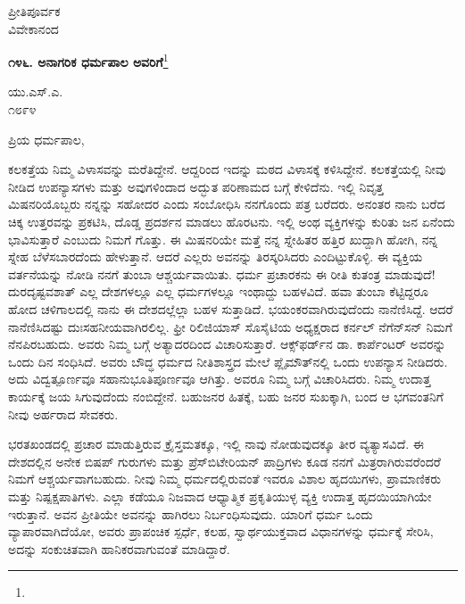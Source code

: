 {\flushright
ಪ್ರೀತಿಪೂರ್ವಕ\\ವಿವೇಕಾನಂದ\par}
\vspace{-0.5cm}

\begin{center}
\textbf{೧೪೬. ಅನಾಗರಿಕ ಧರ್ಮಪಾಲ ಅವರಿಗೆ}\footnote{}
\end{center}

\vspace{-0.6cm}

\begin{flushright}
ಯು.ಎಸ್.ಎ.\\೧೮೯೪
\end{flushright}

\vspace{-0.6cm}

\noindent
ಪ್ರಿಯ ಧರ್ಮಪಾಲ,

ಕಲಕತ್ತೆಯ ನಿಮ್ಮ ವಿಳಾಸವನ್ನು ಮರೆತಿದ್ದೇನೆ. ಆದ್ದರಿಂದ ಇದನ್ನು ಮಠದ ವಿಳಾಸಕ್ಕೆ ಕಳಿಸಿದ್ದೇನೆ. ಕಲಕತ್ತೆಯಲ್ಲಿ ನೀವು ನೀಡಿದ ಉಪನ್ಯಾಸಗಳು ಮತ್ತು ಅವುಗಳಿಂದಾದ ಅದ್ಭುತ ಪರಿಣಾಮದ ಬಗ್ಗೆ ಕೇಳಿದೆನು. ಇಲ್ಲಿ ನಿವೃತ್ತ ಮಿಷನರಿಯೊಬ್ಬರು ನನ್ನನ್ನು ಸಹೋದರ ಎಂದು ಸಂಬೋಧಿಸಿ ನನಗೊಂದು ಪತ್ರ ಬರೆದರು. ಅನಂತರ ನಾನು ಬರೆದ ಚಿಕ್ಕ ಉತ್ತರವನ್ನು ಪ್ರಕಟಿಸಿ, ದೊಡ್ಡ ಪ್ರದರ್ಶನ ಮಾಡಲು ಹೊರಟನು. ಇಲ್ಲಿ ಅಂಥ ವ್ಯಕ್ತಿಗಳನ್ನು ಕುರಿತು ಜನ ಏನೆಂದು ಭಾವಿಸುತ್ತಾರೆ ಎಂಬುದು ನಿಮಗೆ ಗೊತ್ತು. ಈ ಮಿಷನರಿಯೇ ಮತ್ತೆ ನನ್ನ ಸ್ನೇಹಿತರ ಹತ್ತಿರ ಖುದ್ದಾಗಿ ಹೋಗಿ, ನನ್ನ ಸ್ನೇಹ ಬೆಳೆಸಬಾರದೆಂದು ಹೇಳುತ್ತಾನೆ. ಆದರೆ ಎಲ್ಲರು ಅವನನ್ನು ತಿರಸ್ಕರಿಸಿದರು ಎಂದಿಟ್ಟುಕೊಳ್ಳಿ. ಈ ವ್ಯಕ್ತಿಯ ವರ್ತನೆಯನ್ನು ನೋಡಿ ನನಗೆ ತುಂಬಾ ಆಶ್ಚರ್ಯವಾಯಿತು. ಧರ್ಮ ಪ್ರಚಾರಕನು ಈ ರೀತಿ ಕುತಂತ್ರ ಮಾಡುವುದೆ!ದುರದೃಷ್ಟವಶಾತ್ ಎಲ್ಲ ದೇಶಗಳಲ್ಲೂ ಎಲ್ಲ ಧರ್ಮಗಳಲ್ಲೂ ಇಂಥಾದ್ದು ಬಹಳವಿದೆ. ಹವಾ ತುಂಬಾ ಕೆಟ್ಟಿದ್ದರೂ ಹೋದ ಚಳಿಗಾಲದಲ್ಲಿ ನಾನು ಈ ದೇಶದಲ್ಲೆಲ್ಲಾ ಬಹಳ ಸುತ್ತಾಡಿದೆ. ಭಯಂಕರವಾಗಿರುವುದೆಂದು ನಾನೆಣಿಸಿದ್ದೆ. ಆದರೆ ನಾನೆಣಿಸಿದಷ್ಟು ದುಃಸಹನೀಯವಾಗಿರಲಿಲ್ಲ. ಫ್ರೀ ರಿಲಿಜಿಯಾಸ್ ಸೊಸೈಟಿಯ ಅಧ್ಯಕ್ಷರಾದ ಕರ್ನಲ್ ನೆಗೆನ್‌ಸನ್ ನಿಮಗೆ ನೆನಪಿರಬಹುದು. ಅವರು ನಿಮ್ಮ ಬಗ್ಗೆ ಅತ್ಯಾದರದಿಂದ ವಿಚಾರಿಸುತ್ತಾರೆ. ಆಕ್ಸ್‌ಫರ್ಡ್‌ನ ಡಾ. ಕಾರ್ಪೆಂಟರ್ ಅವರನ್ನು ಒಂದು ದಿನ ಸಂಧಿಸಿದೆ. ಅವರು ಬೌದ್ಧ ಧರ್ಮದ ನೀತಿಶಾಸ್ತ್ರದ ಮೇಲೆ ಪ್ಲೈಮೌತ್‌ನಲ್ಲಿ ಒಂದು ಉಪನ್ಯಾಸ ನೀಡಿದರು. ಅದು ವಿದ್ವತ್ಪೂರ್ಣವೂ ಸಹಾನುಭೂತಿಪೂರ್ಣವೂ ಆಗಿತ್ತು. ಅವರೂ ನಿಮ್ಮ ಬಗ್ಗೆ ವಿಚಾರಿಸಿದರು. ನಿಮ್ಮ ಉದಾತ್ತ ಕಾರ್ಯಕ್ಕೆ ಜಯ ಸಿಗುವುದೆಂದು ನಂಬಿದ್ದೇನೆ. ಬಹುಜನರ ಹಿತಕ್ಕೆ, ಬಹು ಜನರ ಸುಖಕ್ಕಾಗಿ, ಬಂದ ಆ ಭಗವಂತನಿಗೆ ನೀವು ಅರ್ಹರಾದ ಸೇವಕರು.

ಭರತಖಂಡದಲ್ಲಿ ಪ್ರಚಾರ ಮಾಡುತ್ತಿರುವ ಕ್ರೈಸ್ತಮತಕ್ಕೂ, ಇಲ್ಲಿ ನಾವು ನೋಡುವುದಕ್ಕೂ ತೀರ ವ್ಯತ್ಯಾಸವಿದೆ. ಈ ದೇಶದಲ್ಲಿನ ಅನೇಕ ಬಿಷಪ್ ಗುರುಗಳು ಮತ್ತು ಪ್ರೆಸ್‌ಬಿಟೇರಿಯನ್ ಪಾದ್ರಿಗಳು ಕೂಡ ನನಗೆ ಮಿತ್ರರಾಗಿರುವರೆಂದರೆ ನಿಮಗೆ ಆಶ್ಚರ್ಯವಾಗಬಹುದು. ನೀವು ನಿಮ್ಮ ಧರ್ಮದಲ್ಲಿರುವಂತೆ ಇವರೂ ವಿಶಾಲ ಹೃದಯಿಗಳು, ಪ್ರಾಮಾಣಿಕರು ಮತ್ತು ನಿಷ್ಪಕ್ಷಪಾತಿಗಳು. ಎಲ್ಲಾ ಕಡೆಯೂ ನಿಜವಾದ ಆಧ್ಯಾತ್ಮಿಕ ಪ್ರಕೃತಿಯುಳ್ಳ ವ್ಯಕ್ತಿ ಉದಾತ್ತ ಹೃದಯಿಯಾಗಿಯೇ ಇರುತ್ತಾನೆ. ಅವನ ಪ್ರೀತಿಯೇ ಅವನನ್ನು ಹಾಗಿರಲು ನಿರ್ಬಂಧಿಸುವುದು. ಯಾರಿಗೆ ಧರ್ಮ ಒಂದು ವ್ಯಾಪಾರವಾಗಿದೆಯೋ, ಅವರು ಪ್ರಾಪಂಚಿಕ ಸ್ಪರ್ಧೆ, ಕಲಹ, ಸ್ವಾರ್ಥಯುಕ್ತವಾದ ವಿಧಾನಗಳನ್ನು ಧರ್ಮಕ್ಕೆ ಸೇರಿಸಿ, ಅದನ್ನು ಸಂಕುಚಿತವಾಗಿ ಹಾನಿಕರವಾಗುವಂತೆ ಮಾಡಿದ್ದಾರೆ.

